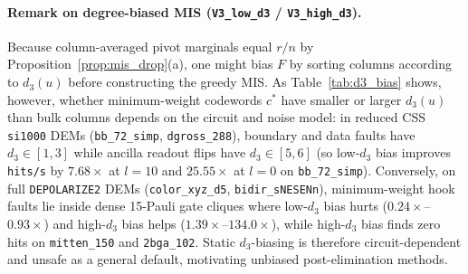 \documentclass[12pt]{article}
\theoremstyle{definition}
\newcommand{\ttt}[1]{\texttt{#1}}
\begin{document}
\paragraph{Remark on degree-biased MIS (\ttt{V3\_low\_d3} / \ttt{V3\_high\_d3}).}
Because column-averaged pivot marginals equal $r/n$ by Proposition~\ref{prop:mis_drop}(a), one might bias $F$ by
sorting columns according to $d_3(u)$ before constructing the greedy MIS. As Table~\ref{tab:d3_bias} shows,
however, whether minimum-weight codewords $c^*$ have smaller or larger $d_3(u)$ than bulk columns depends on the
circuit and noise model: in reduced CSS \ttt{si1000} DEMs (\ttt{bb\_72\_simp}, \ttt{dgross\_288}), boundary and
data faults have $d_3 \in [1, 3]$ while ancilla readout flips have $d_3 \in [5, 6]$ (so low-$d_3$ bias improves
\ttt{hits/s} by $7.68\times$ at $l = 10$ and $25.55\times$ at $l = 0$ on \ttt{bb\_72\_simp}). Conversely, on full
\ttt{DEPOLARIZE2} DEMs (\ttt{color\_xyz\_d5}, \ttt{bidir\_sNESENn}), minimum-weight hook faults lie inside dense
15-Pauli gate cliques where low-$d_3$ bias hurts ($0.24\times$--$0.93\times$) and high-$d_3$ bias helps
($1.39\times$--$134.0\times$), while high-$d_3$ bias finds zero hits on \ttt{mitten\_150} and \ttt{2bga\_102}.
Static $d_3$-biasing is therefore circuit-dependent and unsafe as a general default, motivating unbiased
post-elimination methods.
\end{document}
